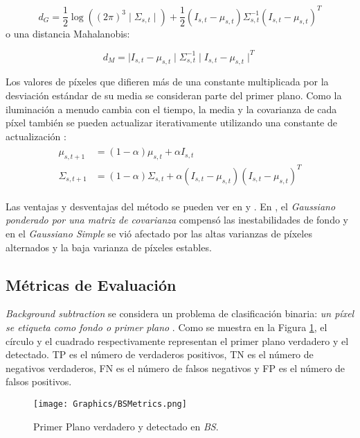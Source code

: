 $$d_G = \frac{1}{2}\log((2\pi)^3\mid\Sigma_{s,t}\mid)+\frac{1}{2}(I_{s,t}-\mu_{s,t})\Sigma_{s,t}^{-1}(I_{s,t}-\mu_{s,t})^T$$
o una distancia Mahalanobis:

$$d_M = \mid I_{s,t}-\mu_{s,t}\mid\Sigma_{s,t}^{-1}\mid I_{s,t}-\mu_{s,t}\mid^T$$

Los valores de píxeles que difieren más de una constante multiplicada por la desviación estándar de su media se consideran parte del primer plano. Como la iluminación a menudo cambia con el tiempo, la media y la covarianza de cada píxel también se pueden actualizar iterativamente utilizando una constante de actualización \cite{YannickPierreMarcBrunoHeleneChristophe}:
\begin{gather*}
    \begin{split}
        \mu_{s,t+1} & = (1-\alpha)\mu_{s,t}+\alpha I_{s,t}\\
        \Sigma_{s,t+1} & = (1-\alpha)\Sigma_{s,t}+\alpha(I_{s,t}-\mu_{s,t})(I_{s,t}-\mu_{s,t})^T
    \end{split}
\end{gather*}

Las ventajas y desventajas del método se pueden ver en \cite{BenezethJodoinEmileLaurentRosenberger} y \cite{GreffBrandoKrauStrickerClua}. En \cite{BenezethJodoinEmileLaurentRosenberger}, el \textit{Gaussiano ponderado por una matriz de covarianza} compensó las inestabilidades de fondo y en \cite{GreffBrandoKrauStrickerClua} el \textit{Gaussiano Simple} se vió afectado por las altas varianzas de píxeles alternados y la baja varianza de píxeles estables.

\subsection{Métricas de Evaluación}

\textit{Background subtraction} se considera un problema de clasificación binaria: \textit {un píxel se etiqueta como fondo o primer plano} \cite{GuangleTaoJiandanPingWenwu}. Como se muestra en la Figura \ref{fig:BSMetrics}, el círculo y el cuadrado respectivamente representan el primer plano verdadero y el detectado. TP es el número de verdaderos positivos, TN es el número de negativos verdaderos, FN es el número de falsos negativos y FP es el número de falsos positivos.\\

\begin{figure}[!h]
    \centering
    \texttt{[image: Graphics/BSMetrics.png]}
    \caption{Primer Plano verdadero y detectado en \textit{BS}.}
    \label{fig:BSMetrics}
\end{figure}

